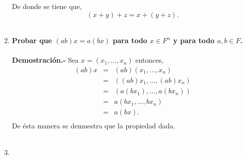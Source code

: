 \begin{multicols}{2}
\begin{enumerate}
	 De donde se tiene que,
	 $$(x+y)+z=x+(y+z).$$\\

     \item \textbf{\boldmath Probar que $(ab)x=a(bx)$ para todo $x\in F^n$ y para todo $a,b \in F$.}\\\\
	 \textbf{Demostración.-}\; Sea $x=(x_1,\ldots,x_n)$ entonces,
	 $$\begin{array}{rcl}
	     (ab)x&=&(ab)(x_1,\ldots,x_n)\\
		  &=&((ab)x_1,\ldots,(ab)x_n)\\
		  &=&(a(bx_1),\ldots,a(bx_n))\\
		  &=&a(bx_1,\ldots,bx_n)\\
		  &=&a(bx).\\
	 \end{array}$$
	 De ésta manera se demuestra que la propiedad dada.\\\\

    \item 


\end{enumerate}


\end{multicols}
